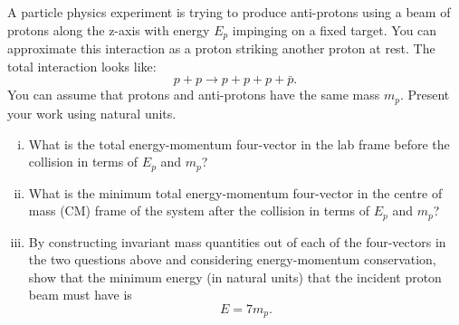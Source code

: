 A particle physics experiment is trying to produce anti-protons using a beam of protons along the z-axis
with energy $E_p$ impinging on a fixed target. You can approximate
this interaction as a proton striking another proton at rest. The
total interaction looks like:
\[ p+p\to p+p+p+\bar{p}.\] 
You can assume that protons and anti-protons have the same mass
$m_p$. Present your work using natural units.
\begin{enumerate}[(i)]
\item What is the total energy-momentum four-vector in the lab frame before
the collision in terms of $E_p$ and $m_p$?
\answerbox{
\[p^{\mu}_{TOT}=\vIV{E_P+m}{0}{0}{\sqrt{E_{p}^{2}-m_{p}^{2}}}\]
}
\item What is the minimum total energy-momentum four-vector in the centre of mass (CM)  frame
of the system after the collision in terms of $E_p$ and $m_p$?
\item By constructing invariant mass quantities out of each of the
four-vectors in the two questions above and considering
energy-momentum conservation, show that the minimum energy (in natural units) that the incident proton beam must have is \[E=7m_p.\]
\end{enumerate}


